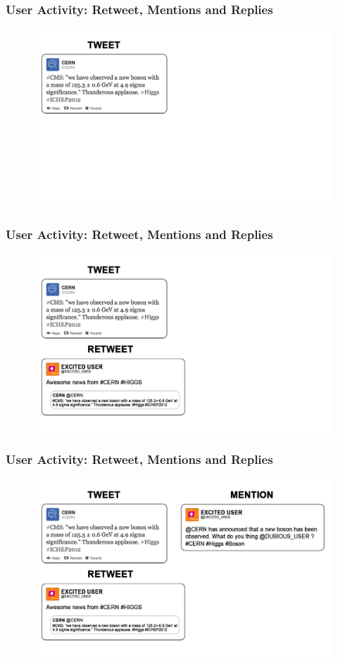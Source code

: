 \documentclass{beamer}
\begin{document}
\begin{frame}
\frametitle{User Activity: Retweet, Mentions and Replies}
\begin{figure}
\includegraphics[width=1\linewidth]{figures/tweets/tweet}
\end{figure}
\end{frame}

\begin{frame}
\frametitle{User Activity: Retweet, Mentions and Replies}
\begin{figure}
\includegraphics[width=1\linewidth]{figures/tweets/retweet}
\end{figure}
\end{frame}

\begin{frame}
\frametitle{User Activity: Retweet, Mentions and Replies}
\begin{figure}
\includegraphics[width=1\linewidth]{figures/tweets/mention}
\end{figure}
\end{frame}
\end{document}
